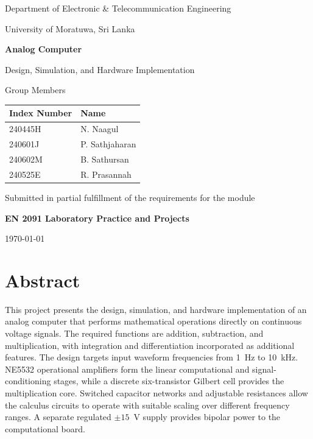 \documentclass[11pt,a4paper]{article}
\renewenvironment{abstract}{\section*{Abstract}\addcontentsline{toc}{section}{Abstract}}{\par}
\begin{document}
\begin{titlepage}
\centering
\vspace*{0.5cm}
{\large Department of Electronic \& Telecommunication Engineering\par}
{\large University of Moratuwa, Sri Lanka\par}
\vspace{2.2cm}
{\LARGE\bfseries Analog Computer\par}
\vspace{0.5cm}
{\large Design, Simulation, and Hardware Implementation\par}
\vspace{2.5cm}
{\large Group Members\par}
\vspace{0.4cm}
\begin{tabular}{ll}
\toprule
\textbf{Index Number} & \textbf{Name}\\
\midrule
240445H & N. Naagul\\
240601J & P. Sathjaharan\\
240602M & B. Sathursan\\
240525E & R. Prasannah\\
\bottomrule
\end{tabular}
\vfill
Submitted in partial fulfillment of the requirements for the module\par
\textbf{EN 2091 Laboratory Practice and Projects}\par
\vspace{1cm}
{\large\today\par}
\end{titlepage}

\begin{abstract}
This project presents the design, simulation, and hardware implementation of an analog computer that performs mathematical operations directly on continuous voltage signals. The required functions are addition, subtraction, and multiplication, with integration and differentiation incorporated as additional features. The design targets input waveform frequencies from 1~Hz to 10~kHz. NE5532 operational amplifiers form the linear computational and signal-conditioning stages, while a discrete six-transistor Gilbert cell provides the multiplication core. Switched capacitor networks and adjustable resistances allow the calculus circuits to operate with suitable scaling over different frequency ranges. A separate regulated $\pm15$~V supply provides bipolar power to the computational board.

\end{abstract}
\clearpage
\end{document}
